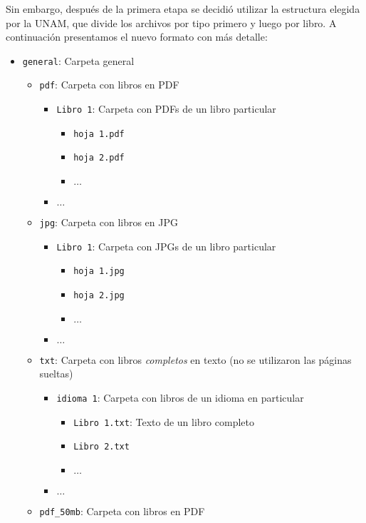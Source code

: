 \documentclass[11pt]{article}
\begin{document}
Sin embargo, después de la primera etapa se decidió utilizar la estructura elegida por la UNAM, que divide los archivos por tipo primero y luego por libro. A continuación presentamos el nuevo formato con más detalle:

\begin{itemize}
	\item \texttt{general}: Carpeta general
	\begin{itemize}
		\item \texttt{pdf}: Carpeta con libros en PDF
		\begin{itemize}
			\item \texttt{Libro 1}: Carpeta con PDFs de un libro particular
			\begin{itemize}
				\item \texttt{hoja 1.pdf}
				\item \texttt{hoja 2.pdf}
				\item $\dots$
			\end{itemize}
			\item $\dots$
		\end{itemize}
		\item \texttt{jpg}: Carpeta con libros en JPG
			\begin{itemize}
			\item \texttt{Libro 1}: Carpeta con JPGs de un libro particular
			\begin{itemize}
				\item \texttt{hoja 1.jpg}
				\item \texttt{hoja 2.jpg}
				\item $\dots$
			\end{itemize}
			\item $\dots$
		\end{itemize}
		\item \texttt{txt}: Carpeta con libros \emph{completos} en texto (no se utilizaron las páginas sueltas)
		\begin{itemize}
			\item \texttt{idioma 1}: Carpeta con libros de un idioma en particular
			\begin{itemize}
				\item \texttt{Libro 1.txt}: Texto de un libro completo
				\item \texttt{Libro 2.txt}
				\item $\dots$
			\end{itemize}
			\item $\dots$
		\end{itemize}
		\item \texttt{pdf_50mb}: Carpeta con libros en PDF

\end{itemize}
\end{itemize}
\end{document}
